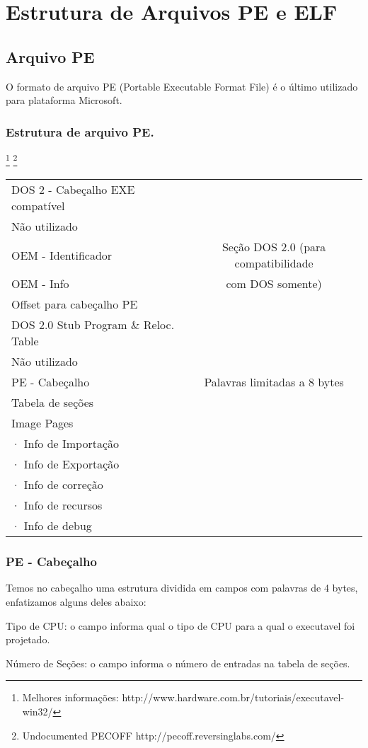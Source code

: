 \chapter{Estrutura de Arquivos PE e ELF}

\section{Arquivo PE}

O formato de arquivo PE (Portable Executable Format File) é o último
utilizado para plataforma Microsoft.


\subsection{Estrutura de arquivo PE.} \footnote{Melhores informações: http://www.hardware.com.br/tutoriais/executavel-win32/} \footnote{Undocumented PECOFF http://pecoff.reversinglabs.com/}
\begin{list}{}
\item {\begin{tabular}{|l|c|}
\hline 
DOS 2 - Cabeçalho EXE compatível  & \tabularnewline
\cline{1-1} 
Não utilizado  & \tabularnewline
\cline{1-1} 
OEM - Identificador  & Seção DOS 2.0 (para compatibilidade \tabularnewline
OEM - Info  & com DOS somente)\tabularnewline
Offset para cabeçalho PE & \tabularnewline
\cline{1-1} 
DOS 2.0 Stub Program \& Reloc. Table  & \tabularnewline
\hline 
Não utilizado & \tabularnewline
\hline 
PE - Cabeçalho & Palavras limitadas a 8 bytes\tabularnewline
\hline 
Tabela de seções & \tabularnewline
\hline
Image Pages  & \tabularnewline
· Info de Importação & \tabularnewline
· Info de Exportação  & \tabularnewline
· Info de correção & \tabularnewline
· Info de recursos & \tabularnewline
· Info de debug & \tabularnewline
\hline
\end{tabular}}
\end{list}

\subsection{PE - Cabeçalho}


Temos no cabeçalho uma estrutura dividida em campos com palavras
de 4 bytes, enfatizamos alguns deles abaixo:


Tipo de CPU: o campo informa qual o tipo de CPU para a qual o executavel
foi projetado.


Número de Seções: o campo informa o número de entradas na tabela
de seções.


